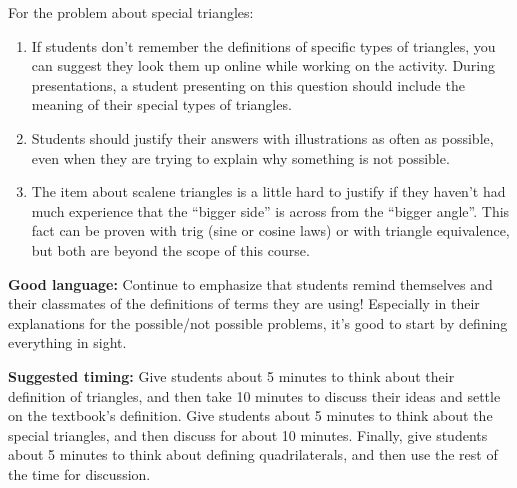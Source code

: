 \documentclass[nooutcomes,noauthor]{ximera}
\begin{document}
\begin{instructorNotes}
For the problem about special triangles:
\begin{enumerate}
\item If students don't remember the definitions of specific types of triangles, you can suggest they look them up online while working on the activity.  During presentations, a student presenting on this question should include the meaning of their special types of triangles.
\item Students should justify their answers with illustrations as often as possible, even when they are trying to explain why something is not possible.
\item The item about scalene triangles is a little hard to justify if they haven't had much experience that the ``bigger side'' is across from the ``bigger angle''.  This fact can be proven with trig (sine or cosine laws) or with triangle equivalence, but both are beyond the scope of this course.
\end{enumerate}

{\bf Good language:} Continue to emphasize that students remind themselves and their classmates of the definitions of terms they are using! Especially in their explanations for the possible/not possible problems, it's good to start by defining everything in sight.



{\bf Suggested timing:} Give students about 5 minutes to think about their definition of triangles, and then take 10 minutes to discuss their ideas and settle on the textbook's definition. Give students about 5 minutes to think about the special triangles, and then discuss for about 10 minutes. Finally, give students about 5 minutes to think about defining quadrilaterals, and then use the rest of the time for discussion.


\end{instructorNotes}
\end{document}
